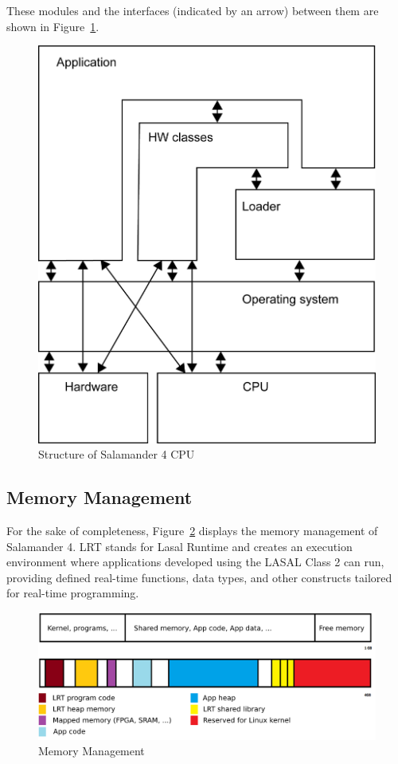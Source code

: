 \documentclass[MMR,Master,english]{twbook}
\begin{document}
\noindent These modules and the interfaces (indicated by an arrow) between them are shown in Figure~\ref{fig:lasal_cpu}.

\begin{figure}[H]
	\centering
	\includegraphics[width=0.5\columnwidth]{img/Software-Struktur_einer_LASAL_CPU.png}
	\caption[Structure of Salamander 4 CPU]{Structure of Salamander 4 CPU}
	\label{fig:lasal_cpu}
\end{figure}

\subsection{Memory Management}
\noindent For the sake of completeness, Figure~\ref{fig:memory_management} displays the memory management of Salamander 4. LRT stands for Lasal Runtime and creates an execution environment where applications developed using the LASAL Class 2 can run, providing defined real-time functions, data types, and other constructs tailored for real-time programming.

\begin{figure}[H]
	\centering
	\includegraphics[width=0.8\columnwidth]{img/RAM_Memory_management.png}
	\caption[Memory Management]{Memory Management}
	\label{fig:memory_management}
\end{figure}
\end{document}
